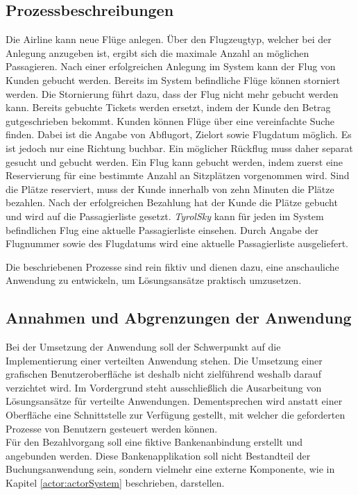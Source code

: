 \subsection{Prozessbeschreibungen}
\begin{enumerate}
   Die Airline kann neue Flüge anlegen. Über den Flugzeugtyp, welcher bei der Anlegung anzugeben ist, ergibt sich die maximale Anzahl an möglichen Passagieren. Nach einer erfolgreichen Anlegung im System kann der Flug von Kunden gebucht werden.
   Bereits im System befindliche Flüge können storniert werden. Die Stornierung führt dazu, dass der Flug nicht mehr gebucht werden kann. Bereits gebuchte Tickets werden ersetzt, indem der Kunde den Betrag gutgeschrieben bekommt.
  Kunden können Flüge über eine vereinfachte Suche finden. Dabei ist die Angabe von Abflugort, Zielort sowie Flugdatum möglich. Es ist jedoch nur eine Richtung buchbar. Ein möglicher Rückflug muss daher separat gesucht und gebucht werden. 
  Ein Flug kann gebucht werden, indem zuerst eine Reservierung für eine bestimmte Anzahl an Sitzplätzen vorgenommen wird. Sind die Plätze reserviert, muss der Kunde innerhalb von zehn Minuten die Plätze bezahlen. Nach der erfolgreichen Bezahlung hat der Kunde die Plätze gebucht und wird auf die Passagierliste gesetzt. 
  \textit{TyrolSky} kann für jeden im System befindlichen Flug eine aktuelle Passagierliste einsehen. Durch Angabe der Flugnummer sowie des Flugdatums wird eine aktuelle Passagierliste ausgeliefert.
\end{enumerate}
Die beschriebenen Prozesse sind rein fiktiv und dienen dazu, eine anschauliche Anwendung zu entwickeln, um Lösungsansätze praktisch umzusetzen. 

\subsection{Annahmen und Abgrenzungen der Anwendung}
Bei der Umsetzung der Anwendung soll der Schwerpunkt auf die Implementierung einer verteilten Anwendung stehen. Die Umsetzung einer grafischen Benutzeroberfläche ist deshalb nicht zielführend weshalb darauf verzichtet wird. Im Vordergrund steht ausschließlich die Ausarbeitung von Lösungsansätze für verteilte Anwendungen. Dementsprechen wird anstatt einer Oberfläche eine Schnittstelle zur Verfügung gestellt, mit welcher die geforderten Prozesse von Benutzern gesteuert werden können. \\
Für den Bezahlvorgang soll eine fiktive Bankenanbindung erstellt und angebunden werden. Diese Bankenapplikation soll nicht Bestandteil der Buchungsanwendung sein, sondern vielmehr eine externe Komponente, wie in Kapitel \ref{actor:actorSystem} beschrieben, darstellen. 

